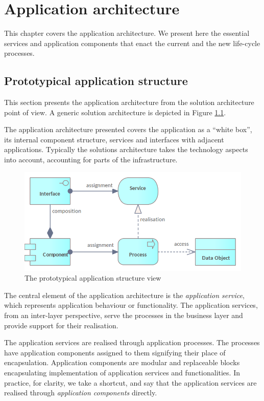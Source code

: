 \chapter{Application architecture}
\label{sec:application-architecture}
	
    This chapter covers the application architecture. We present here the essential services and application components that enact the current and the new life-cycle processes.

	\section{Prototypical application structure}
	
	This section presents the application architecture from the solution architecture point of view. A generic solution architecture is depicted in Figure \ref{fig:application-view}.
	
	The application architecture presented covers the application as a ``white box'', its internal component structure, services and interfaces with adjacent applications. Typically the solutions architecture takes the technology aspects into account, accounting for parts of the infrastructure.
	
    \begin{figure}[h]
		\centering
		\includegraphics[width=.6\textwidth]{images/views/Application view.png}
		\caption{The prototypical application structure view}
		\label{fig:application-view}
	\end{figure}

	The central element of the application architecture is the \textit{application service}, which represents application behaviour or functionality. The application services, from an inter-layer perspective, serve the processes in the business layer and provide support for their realisation. 
	
	The application services are realised through application processes. The processes have application components assigned to them signifying their place of encapsulation. Application components are modular and replaceable blocks encapsulating implementation of application services and functionalities. In practice, for clarity, we take a shortcut, and say that the application services are realised through \textit{application components} directly.
	
